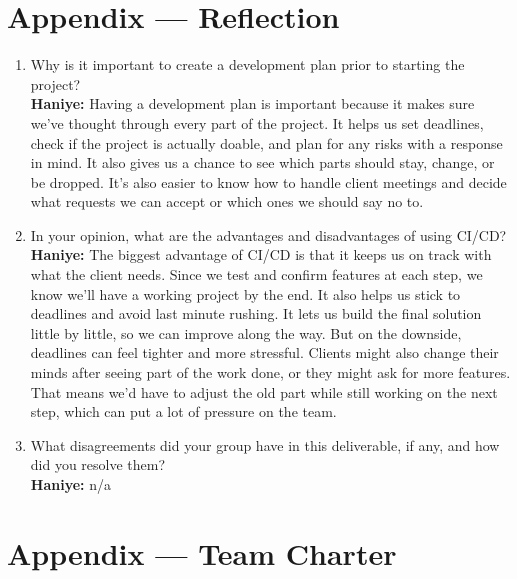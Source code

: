 \documentclass{article}
\begin{document}
\newpage{}

\section*{Appendix --- Reflection}




\begin{enumerate}
    \item Why is it important to create a development plan prior to starting the
    project?\\
    \textbf{Haniye:} Having a development plan is important because it makes sure we’ve thought through every part of the project. It helps us set deadlines, check if the project is actually doable, and plan for any risks with a response in mind. It also gives us a chance to see which parts should stay, change, or be dropped. It’s also easier to know how to handle client meetings and decide what requests we can accept or which ones we should say no to.

    \item In your opinion, what are the advantages and disadvantages of using
    CI/CD?\\
    \textbf{Haniye:} The biggest advantage of CI/CD is that it keeps us on track with what the client needs. Since we test and confirm features at each step, we know we’ll have a working project by the end. It also helps us stick to deadlines and avoid last minute rushing. It lets us build the final solution little by little, so we can improve along the way. But on the downside, deadlines can feel tighter and more stressful. Clients might also change their minds after seeing part of the work done, or they might ask for more features. That means we’d have to adjust the old part while still working on the next step, which can put a lot of pressure on the team.

    \item What disagreements did your group have in this deliverable, if any,
    and how did you resolve them?\\
     \textbf{Haniye:} n/a
\end{enumerate}

\newpage{}

\section*{Appendix --- Team Charter}
\end{document}
